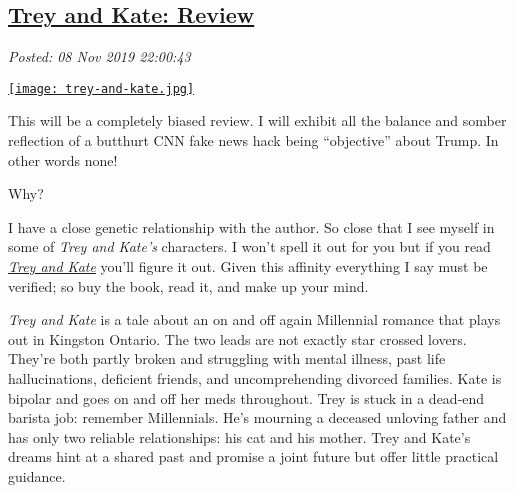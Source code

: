 %

\subsection*{\href{http://analyzethedatanotthedrivel.org/2019/11/08/trey-and-kate-review/}{Trey and Kate: Review}}


\noindent\emph{Posted: 08 Nov 2019 22:00:43}
\vspace{6pt}


\captionsetup[floatingfigure]{labelformat=empty}
\begin{floatingfigure}[l]{0.25\textwidth}
\centering
\href{https://www.amazon.com/gp/product/1687011508/ref=x_gr_w_bb_glide_sout?ie=UTF8\&tag=x_gr_w_bb_glide_sout-20\&linkCode=as2\&camp=1789\&creative=9325\&creativeASIN=1687011508\&SubscriptionId=1MGPYB6YW3HWK55XCGG2}{\texttt{[image: trey-and-kate.jpg]}}
\label{fig:5625x0}
\end{floatingfigure}

This will be a completely biased review. I will exhibit all the balance
and somber reflection of a butthurt CNN fake news hack being
``objective'' about Trump. In other words none!

Why?

I have a close genetic relationship with the author. So close that I see
myself in some of \emph{Trey and Kate's} characters. I won't spell it
out for you but if you read
\emph{\href{https://www.amazon.com/gp/product/1687011508/ref=x_gr_w_bb_glide_sout?ie=UTF8\&tag=x_gr_w_bb_glide_sout-20\&linkCode=as2\&camp=1789\&creative=9325\&creativeASIN=1687011508\&SubscriptionId=1MGPYB6YW3HWK55XCGG2}{Trey
and Kate}} you'll figure it out. Given this affinity everything I say
must be verified; so buy the book, read it, and make up your mind.

\emph{Trey and Kate} is a tale about an on and off again Millennial
romance that plays out in Kingston Ontario. The two leads are not
exactly star crossed lovers. They're both partly broken and struggling
with mental illness, past life hallucinations, deficient friends, and
uncomprehending divorced families. Kate is bipolar and goes on and off
her meds throughout. Trey is stuck in a dead-end barista job: remember
Millennials. He's mourning a deceased unloving father and has only two
reliable relationships: his cat and his mother. Trey and Kate's dreams
hint at a shared past and promise a joint future but offer little
practical guidance.

